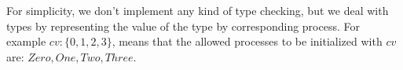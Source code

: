 For simplicity, we don't implement any kind of type checking, but we deal with types by representing the value of the type by corresponding process. For example $cv: \{0,1,2,3\}$, means that the allowed processes to be initialized with $cv$ are: $Zero, One, Two, Three$.